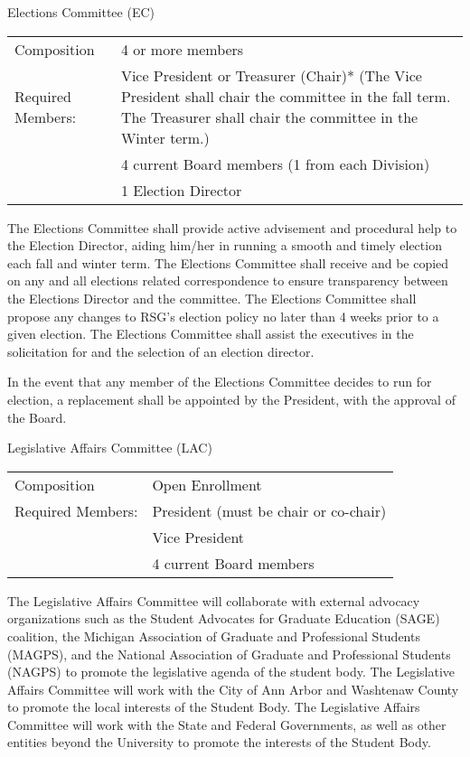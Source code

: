 \begin{enumsubsection}
\begin{enumsubsubsection}
\end{enumsubsubsection}
\item{Elections Committee (EC)}\\
\begin{tabular}{lp{3.5in}}
Composition & 4 or more members\\
Required Members:& Vice President or Treasurer (Chair)* (The Vice 
President shall chair the committee in the fall term. The Treasurer shall 
chair the committee in the Winter term.) \\
 & 4 current Board members (1 from each Division)\\
 & 1 Election Director
\end{tabular}
\begin{enumsubsubsection}
\itemnotoc The Elections Committee shall provide active advisement and 
procedural help to the Election Director, aiding him/her in running a 
smooth and timely election each fall and winter term. 
\itemnotoc The Elections Committee shall receive and be copied on any and all 
elections related correspondence to ensure transparency between the 
Elections Director and the committee.
\itemnotoc The Elections Committee shall propose any changes to RSG's election 
policy no later than 4 weeks prior to a given election. 
\itemnotoc The Elections Committee shall assist the executives in the solicitation for 
and the selection of an election director. 

\itemnotoc In the event that any member of the Elections Committee decides to run for election, a replacement shall be appointed by the President, with the approval of the Board.
\end{enumsubsubsection}


\item{Legislative Affairs Committee (LAC)}\\
\begin{tabular}{ll}
Composition & Open Enrollment\\
Required Members:& President (must be chair or co-chair)\\
 & Vice President\\
 & 4 current Board members
\end{tabular}
\begin{enumsubsubsection}
\itemnotoc The Legislative Affairs Committee will collaborate with external 
advocacy organizations such as the Student Advocates for Graduate 
Education (SAGE) coalition, the Michigan Association of Graduate and 
Professional Students (MAGPS), and the National Association of
Graduate and Professional Students (NAGPS) to promote the legislative 
agenda of the student body. 
\itemnotoc The Legislative Affairs Committee will work with the City of Ann Arbor 
and Washtenaw County to promote the local interests of the Student 
Body. 
\itemnotoc The Legislative Affairs Committee will work with the State and Federal 
Governments, as well as other entities beyond the University to promote 
the interests of the Student Body. 
\end{enumsubsubsection}
\end{enumsubsection}

